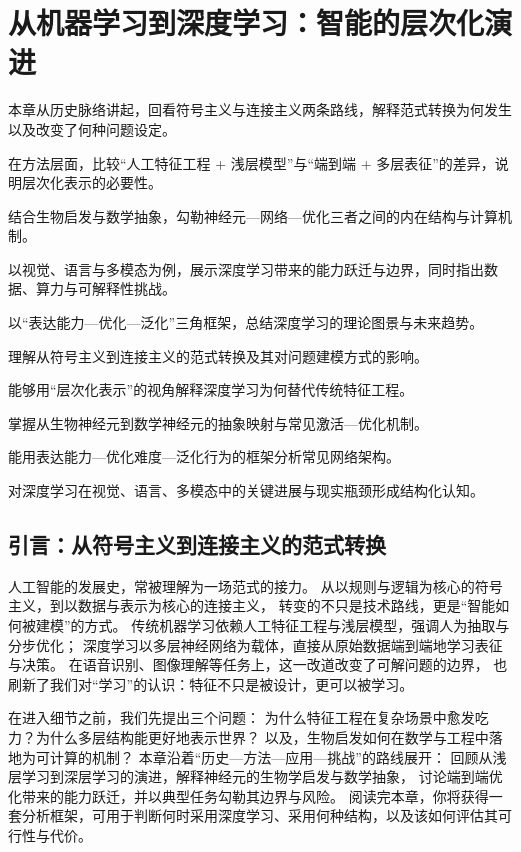 \chapter{从机器学习到深度学习：智能的层次化演进}

\begin{introduction}
  \item 本章从历史脉络讲起，回看符号主义与连接主义两条路线，解释范式转换为何发生以及改变了何种问题设定。
  \item 在方法层面，比较“人工特征工程 + 浅层模型”与“端到端 + 多层表征”的差异，说明层次化表示的必要性。
  \item 结合生物启发与数学抽象，勾勒神经元—网络—优化三者之间的内在结构与计算机制。
  \item 以视觉、语言与多模态为例，展示深度学习带来的能力跃迁与边界，同时指出数据、算力与可解释性挑战。
  \item 以“表达能力—优化—泛化”三角框架，总结深度学习的理论图景与未来趋势。
\end{introduction}

\begin{introduction}
  \item 理解从符号主义到连接主义的范式转换及其对问题建模方式的影响。
  \item 能够用“层次化表示”的视角解释深度学习为何替代传统特征工程。
  \item 掌握从生物神经元到数学神经元的抽象映射与常见激活—优化机制。
  \item 能用表达能力—优化难度—泛化行为的框架分析常见网络架构。
  \item 对深度学习在视觉、语言、多模态中的关键进展与现实瓶颈形成结构化认知。
\end{introduction}

\section{引言：从符号主义到连接主义的范式转换}

人工智能的发展史，常被理解为一场范式的接力。  
从以规则与逻辑为核心的符号主义，到以数据与表示为核心的连接主义，  
转变的不只是技术路线，更是“智能如何被建模”的方式。  
传统机器学习依赖人工特征工程与浅层模型，强调人为抽取与分步优化；  
深度学习以多层神经网络为载体，直接从原始数据端到端地学习表征与决策。  
在语音识别、图像理解等任务上，这一改道改变了可解问题的边界，  
也刷新了我们对“学习”的认识：特征不只是被设计，更可以被学习。

在进入细节之前，我们先提出三个问题：  
为什么特征工程在复杂场景中愈发吃力？为什么多层结构能更好地表示世界？  
以及，生物启发如何在数学与工程中落地为可计算的机制？  
本章沿着“历史—方法—应用—挑战”的路线展开：  
回顾从浅层学习到深层学习的演进，解释神经元的生物学启发与数学抽象，  
讨论端到端优化带来的能力跃迁，并以典型任务勾勒其边界与风险。  
阅读完本章，你将获得一套分析框架，可用于判断何时采用深度学习、采用何种结构，以及该如何评估其可行性与代价。

